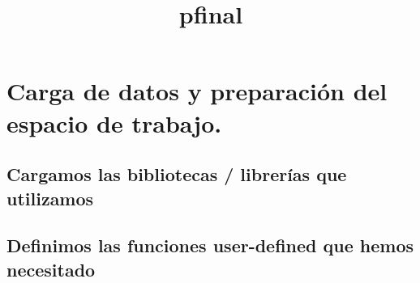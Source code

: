\documentclass[11pt]{article}
\title{pfinal}
\begin{document}
    
    
    \maketitle
    
    

    
    \hypertarget{carga-de-datos-y-preparaciuxf3n-del-espacio-de-trabajo.}{%
\section{Carga de datos y preparación del espacio de
trabajo.}\label{carga-de-datos-y-preparaciuxf3n-del-espacio-de-trabajo.}}

\hypertarget{cargamos-las-bibliotecas-libreruxedas-que-utilizamos}{%
\subsection{Cargamos las bibliotecas / librerías que
utilizamos}\label{cargamos-las-bibliotecas-libreruxedas-que-utilizamos}}

\hypertarget{definimos-las-funciones-user-defined-que-hemos-necesitado}{%
\subsection{Definimos las funciones user-defined que hemos
necesitado}\label{definimos-las-funciones-user-defined-que-hemos-necesitado}}
\end{document}
